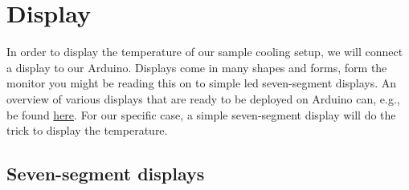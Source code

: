 
\chapter{Display}\label{chap:display}

In order to display the temperature of our sample cooling setup, we will connect a display to our Arduino. Displays come in many shapes and forms, form the monitor you might be reading this on to simple \ac{led} seven-segment displays. An overview of various displays that are ready to be deployed on Arduino can, e.g., be found \href{https://www.arduino.cc/reference//en/libraries/category/display/}{here}. For our specific case, a simple seven-segment display will do the trick to display the temperature.

\section{Seven-segment displays} 

